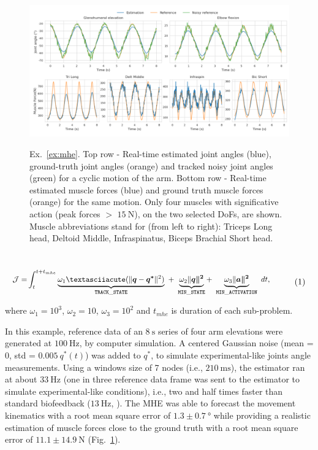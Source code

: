 \begin{figure}[t!] 
\centering 
\includegraphics[width=\textwidth]{figures/MHE_results.pdf}\\
\caption{Ex.~\ref{ex:mhe}. Top row - Real-time estimated joint angles (blue), ground-truth joint angles (orange) and tracked noisy joint angles (green) for a cyclic motion of the arm.
Bottom row - Real-time estimated muscle forces (blue) and ground truth muscle forces (orange) for the same motion.
Only four muscles with significative action (peak forces $>$ $\SI{15}{\newton}$), on the two selected DoFs, are shown.
Muscle abbreviations stand for (from left to right): Triceps Long head, Deltoid Middle, Infraspinatus, Biceps Brachial Short head.} 
\label{fig:MHE_results}
\end{figure} 
\\ 
\[ 
\resizebox{0.9\columnwidth}{!}{$ 
\begin{aligned}
\mathcal{J} = &\int_t^{t+t_{mhe}}\underbrace{\omega_1´(\|\boldsymbol{q} - \boldsymbol{q^*}\|^{2})}_{\mathtt{TRACK\_STATE}}~ 
+ ~ \underbrace{\omega_2\|\boldsymbol{q\|^2}}_{\mathtt{MIN\_STATE}} 
+ ~ \underbrace{\omega_3\|\boldsymbol{a\|^2}}_{\mathtt{MIN\_ACTIVATION}}~dt, 
\end{aligned}   
$}  
\addtag  
\label{eq:ocp_exMHE}  
\]  

\noindent where $\omega_1 =10^3$, $\omega_2 = 10$, $\omega_3 = 10^2$ and $t_{mhe}$ is duration of each sub-problem. 

In this example, reference data of an $\SI{8}{\second}$ series of four arm elevations were generated at $\SI{100}{\Hz}$, by computer simulation.
A centered Gaussian noise (mean = 0, std = $0.005\:q^*(t)$) was added to $q^*$, to simulate experimental-like joints angle measurements.
Using a windows size of 7 nodes (i.e., $\SI{210}{\milli\second}$), the estimator ran at about $\SI{33}{\Hz}$ (one in three reference data frame was sent to the estimator to simulate experimental-like conditions), i.e., two and half times faster than standard biofeedback ($\SI{13}{\Hz}$, \cite{kannape2013self}).
The MHE was able to forecast the movement kinematics with a root mean square error of $1.3\pm\SI{0.7}{\degree}$ while providing a realistic estimation of muscle forces close to the ground truth with a root mean square error of $11.1\pm\SI{14.9}{\newton}$ (Fig.~\ref{fig:MHE_results}).


